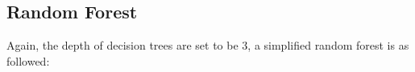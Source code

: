 \documentclass[11pt,a4paper]{article}
\begin{document}
    \newpage
    \subsection{Random Forest} \label{random_forest}
    Again, the depth of decision trees are set to be 3, a simplified random forest is as followed:
    

\end{document}
